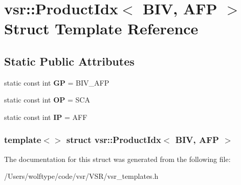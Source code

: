 \hypertarget{structvsr_1_1_product_idx_3_01_b_i_v_00_01_a_f_p_01_4}{\section{vsr\-:\-:Product\-Idx$<$ B\-I\-V, A\-F\-P $>$ Struct Template Reference}
\label{structvsr_1_1_product_idx_3_01_b_i_v_00_01_a_f_p_01_4}
}
\subsection*{Static Public Attributes}
\begin{DoxyCompactItemize}
\item 
\hypertarget{structvsr_1_1_product_idx_3_01_b_i_v_00_01_a_f_p_01_4_ab5a6f11dde1a5ef0bd473337753bba2e}{static const int {\bfseries G\-P} = B\-I\-V\-\_\-\-A\-F\-P}\label{structvsr_1_1_product_idx_3_01_b_i_v_00_01_a_f_p_01_4_ab5a6f11dde1a5ef0bd473337753bba2e}

\item 
\hypertarget{structvsr_1_1_product_idx_3_01_b_i_v_00_01_a_f_p_01_4_aebc8baf5d62ce3c64dc5aeb789350a3e}{static const int {\bfseries O\-P} = S\-C\-A}\label{structvsr_1_1_product_idx_3_01_b_i_v_00_01_a_f_p_01_4_aebc8baf5d62ce3c64dc5aeb789350a3e}

\item 
\hypertarget{structvsr_1_1_product_idx_3_01_b_i_v_00_01_a_f_p_01_4_a38e647bb91983e9ff616a5d2b874ab93}{static const int {\bfseries I\-P} = A\-F\-F}\label{structvsr_1_1_product_idx_3_01_b_i_v_00_01_a_f_p_01_4_a38e647bb91983e9ff616a5d2b874ab93}

\end{DoxyCompactItemize}
\subsubsection*{template$<$$>$ struct vsr\-::\-Product\-Idx$<$ B\-I\-V, A\-F\-P $>$}



The documentation for this struct was generated from the following file\-:\begin{DoxyCompactItemize}
\item 
/\-Users/wolftype/code/vsr/\-V\-S\-R/vsr\-\_\-templates.\-h\end{DoxyCompactItemize}
